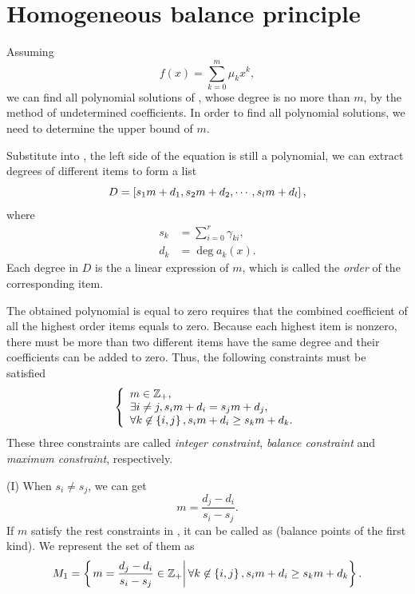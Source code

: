\section{Homogeneous balance principle}\label{Homogeneous-02}

Assuming
\begin{equation}
f(x)=\sum_{k=0}^m{\mu_kx^k},
\label{fm1}
\end{equation}
we can find all polynomial solutions of , whose degree is no more than $m$, by the method of undetermined coefficients. In order to find all polynomial solutions, we need to determine the upper bound of $m$.

Substitute  into , the left side of the equation is still a polynomial, we can extract degrees of different items to form a list
\begin{equation}
D = \left[s_1 m+d_1,s_2 m+d_2,\cdots,s_l m+d_l\right],
\end{equation}
where
\begin{equation}
\begin{split}
s_k&=\sum_{i=0}^r{\gamma_{ki}}, \\
d_k&=\deg a_k(x).
\end{split}
\label{eq-sd}
\end{equation}
Each degree in $D$ is the a linear expression of $m$, which is called the \emph{order} of the corresponding item.

The obtained polynomial is equal to zero requires that the combined coefficient of all the highest order items equals to zero. Because each highest item is nonzero, there must be more than two different items have the same degree and their coefficients can be added to zero. Thus, the following constraints must be satisfied
\begin{equation}
\left\{
\begin{array}{l}
m\in \mathbb Z_+  ,                                     \\
\exists i\neq j, s_i m+d_i=s_j m+d_j    ,               \\
\forall k \not\in \left\{i,j\right\}, s_i m+d_i\ge s_k m+d_k .
\end{array}
\right.
\label{cond}
\end{equation}
These three constraints are called \emph{integer constraint}, \emph{balance constraint} and \emph{maximum constraint}, respectively.

(I) When $s_i \neq s_j$, we can get
\begin{equation}
m=\frac{d_j-d_i}{s_i-s_j}.
\end{equation}
If $m$ satisfy the rest constraints in , it can be called as \BPone{} (balance points of the first kind). We represent the set of them as
\begin{equation}
M_1=\left\{\left. m=\frac{d_j-d_i}{s_i-s_j}\in \mathbb Z_+\right\vert \forall k\not\in \left\{i,j\right\}, s_i m+d_i\ge s_k m+d_k\right\}.
\end{equation}

